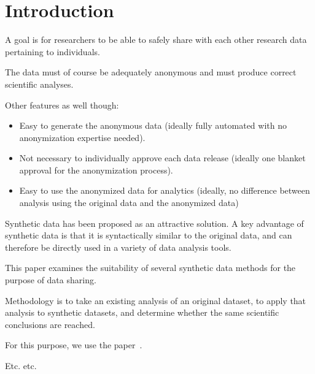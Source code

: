 \section{Introduction}
\label{sec:introduction}

A goal is for researchers to be able to safely share with each other research data pertaining to individuals.

The data must of course be adequately anonymous and must produce correct scientific analyses.

Other features as well though:
\begin{itemize}
    \item Easy to generate the anonymous data (ideally fully automated with no anonymization expertise needed).
    \item Not necessary to individually approve each data release (ideally one blanket approval for the anonymization process).
    \item Easy to use the anonymized data for analytics (ideally, no difference between analysis using the original data and the anonymized data)
\end{itemize}

Synthetic data has been proposed as an attractive solution. A key advantage of synthetic data is that it is syntactically similar to the original data, and can therefore be directly used in a variety of data analysis tools.

This paper examines the suitability of several synthetic data methods for the purpose of data sharing. 

Methodology is to take an existing analysis of an original dataset, to apply that analysis to synthetic datasets, and determine whether the same scientific conclusions are reached.

For this purpose, we use the paper~\cite{jurak2021associations}.

Etc. etc.

